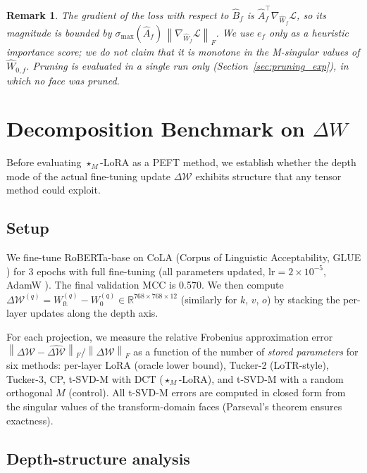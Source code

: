 \documentclass{article}
\newcommand{\R}{\mathbb{R}}
\newcommand{\DeltaW}{\Delta\mathcal{W}}
\newcommand{\norm}[1]{\left\|#1\right\|}
\newcommand{\transpose}{^{\!\top}}
\theoremstyle{plain}
\newtheorem{remark}{Remark}
\begin{document}
\begin{remark}
The gradient of the loss with respect to $\hat{B}_f$ is
$\hat{A}_f\transpose \nabla_{\hat{W}_f} \mathcal{L}$, so its magnitude is bounded by
$\sigma_{\max}(\hat{A}_f)\,\norm{\nabla_{\hat{W}_f}\mathcal{L}}_F$.
We use $e_f$ only as a heuristic importance score; we do not claim that it is monotone in
the M-singular values of $\hat{W}_{0,f}$. Pruning is evaluated in a single run only
(Section~\ref{sec:pruning_exp}), in which no face was pruned.
\end{remark}

\section{Decomposition Benchmark on $\Delta W$}
\label{sec:benchmark}

Before evaluating $\star_M$-LoRA as a PEFT method, we establish whether the depth mode
of the actual fine-tuning update $\DeltaW$ exhibits structure that any tensor method
could exploit.

\subsection{Setup}
\label{sec:bench_setup}

We fine-tune RoBERTa-base \citep{liu2019roberta} on CoLA
(Corpus of Linguistic Acceptability, GLUE \citep{wang2018glue}) for 3 epochs
with full fine-tuning (all parameters updated, $\mathrm{lr} = 2 \times 10^{-5}$,
AdamW \citep{loshchilov2019adamw}).
The final validation MCC is 0.570.
We then compute
$\DeltaW^{(q)} = W_\mathrm{ft}^{(q)} - W_0^{(q)} \in \R^{768 \times 768 \times 12}$
(similarly for $k$, $v$, $o$) by stacking the per-layer updates along the depth axis.

For each projection, we measure the relative Frobenius approximation error
$\norm{\DeltaW - \widehat{\DeltaW}}_F / \norm{\DeltaW}_F$
as a function of the number of \emph{stored parameters} for six methods:
per-layer LoRA (oracle lower bound), Tucker-2 (LoTR-style), Tucker-3, CP,
t-SVD-M with DCT ($\star_M$-LoRA), and t-SVD-M with a random orthogonal $M$ (control).
All t-SVD-M errors are computed in closed form from the singular values of the
transform-domain faces (Parseval's theorem ensures exactness).

\subsection{Depth-structure analysis}
\label{sec:depth_structure}
\end{document}
